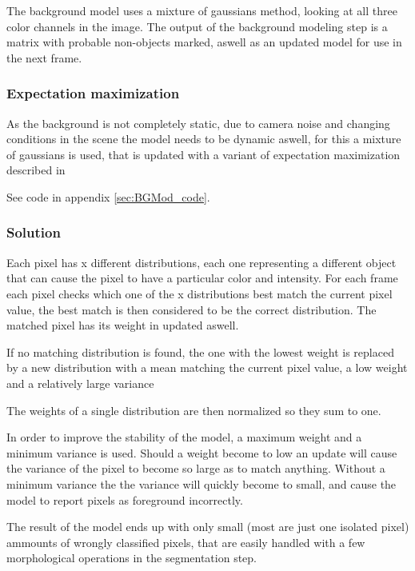 The background model uses a mixture of gaussians method, looking at all three color channels in the image. The output of the background modeling step is a matrix with probable non-objects marked, aswell as an updated model for use in the next frame.

\subsubsection{Expectation maximization}

As the background is not completely static, due to camera noise and changing conditions in the scene the model needs to be dynamic aswell, for this a mixture of gaussians is used, that is updated with a variant of expectation maximization described in \cite{wood}


See code in appendix \ref{sec:BGMod_code}. %

\subsubsection{Solution}

Each pixel has x different distributions, each one representing a different object that can cause the pixel to have a particular color and intensity. For each frame each pixel checks which one of the x distributions best match the current pixel value, the best match is then considered to be the correct distribution. The matched pixel has its weight in updated aswell. 

If no matching distribution is found, the one with the lowest weight is replaced by a new distribution with a mean matching the current pixel value, a low weight and a relatively large variance

The weights of a single distribution are then normalized so they sum to one.

In order to improve the stability of the model, a maximum weight and a minimum variance is used. Should a weight become to low an update will cause the variance of the pixel to become so large as to match anything. Without a minimum variance the the variance will quickly become to small, and cause the model to report pixels as foreground incorrectly.

The result of the model ends up with only small (most are just one isolated pixel) ammounts of wrongly classified pixels, that are easily handled with a few morphological operations in the segmentation step.